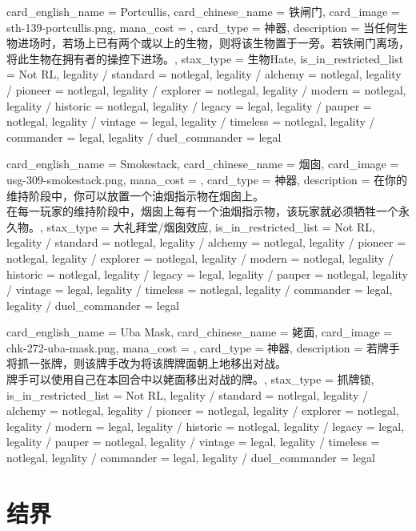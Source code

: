\documentclass[lang = cn, color = black, 10pt]{AllThatStax}
\begin{document}
\card
{
	card_english_name = {Portcullis},
	card_chinese_name = {铁闸门},
	card_image = sth-139-portcullis.png,
	mana_cost = ,
	card_type = 神器,
	description = {当任何生物进场时，若场上已有两个或以上的生物，则将该生物置于一旁。若铁闸门离场，将此生物在拥有者的操控下进场。},
	stax_type = 生物Hate,
	is_in_restricted_list = Not RL,
	legality / standard = notlegal,
	legality / alchemy = notlegal,
	legality / pioneer = notlegal,
	legality / explorer = notlegal,
	legality / modern = notlegal,
	legality / historic = notlegal,
	legality / legacy = legal,
	legality / pauper = notlegal,
	legality / vintage = legal,
	legality / timeless = notlegal,
	legality / commander = legal,
	legality / duel_commander = legal
}

\card
{
	card_english_name = {Smokestack},
	card_chinese_name = {烟囱},
	card_image = usg-309-smokestack.png,
	mana_cost = ,
	card_type = 神器,
	description = {在你的维持阶段中，你可以放置一个油烟指示物在烟囱上。\\
在每一玩家的维持阶段中，烟囱上每有一个油烟指示物，该玩家就必须牺牲一个永久物。},
	stax_type = 大礼拜堂/烟囱效应,
	is_in_restricted_list = Not RL,
	legality / standard = notlegal,
	legality / alchemy = notlegal,
	legality / pioneer = notlegal,
	legality / explorer = notlegal,
	legality / modern = notlegal,
	legality / historic = notlegal,
	legality / legacy = legal,
	legality / pauper = notlegal,
	legality / vintage = legal,
	legality / timeless = notlegal,
	legality / commander = legal,
	legality / duel_commander = legal
}

\card
{
	card_english_name = {Uba Mask},
	card_chinese_name = {姥面},
	card_image = chk-272-uba-mask.png,
	mana_cost = ,
	card_type = 神器,
	description = {若牌手将抓一张牌，则该牌手改为将该牌牌面朝上地移出对战。\\
牌手可以使用自己在本回合中以姥面移出对战的牌。},
	stax_type = 抓牌锁,
	is_in_restricted_list = Not RL,
	legality / standard = notlegal,
	legality / alchemy = notlegal,
	legality / pioneer = notlegal,
	legality / explorer = notlegal,
	legality / modern = legal,
	legality / historic = notlegal,
	legality / legacy = legal,
	legality / pauper = notlegal,
	legality / vintage = legal,
	legality / timeless = notlegal,
	legality / commander = legal,
	legality / duel_commander = legal
}

\section{结界}
\end{document}
